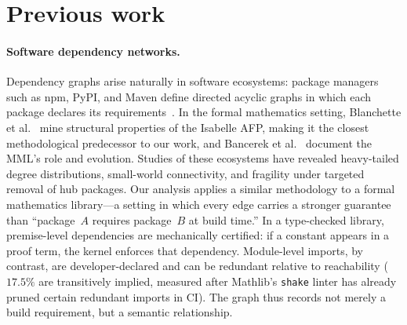 \section{Previous work}
\paragraph{Software dependency networks.}
Dependency graphs arise naturally in software ecosystems: package managers such as npm, PyPI, and Maven define directed acyclic graphs in which each package declares its requirements~\cite{decan2019,labelle2004}. In the formal mathematics setting, Blanchette et al.~\cite{blanchette2015} mine structural properties of the Isabelle AFP, making it the closest methodological predecessor to our work, and Bancerek et al.~\cite{bancerek2018} document the MML's role and evolution. Studies of these ecosystems have revealed heavy-tailed degree distributions, small-world connectivity, and fragility under targeted removal of hub packages. Our analysis applies a similar methodology to a formal mathematics library---a setting in which every edge carries a stronger guarantee than ``package~$A$ requires package~$B$ at build time.'' In a type-checked library, premise-level dependencies are mechanically certified: if a constant appears in a proof term, the kernel enforces that dependency. Module-level imports, by contrast, are developer-declared and can be redundant relative to reachability ($17.5\%$ are transitively implied, measured after Mathlib's \texttt{shake} linter has already pruned certain redundant imports in CI). The graph thus records not merely a build requirement, but a semantic relationship.

